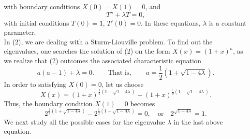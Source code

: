 \documentclass[12pt]{article}
\begin{document}
with boundary conditions $X(0)=X(1)=0$, and
\begin{equation}
T''+\lambda T=0,
\end{equation}
with initial conditions $T(0)=1$, $T'(0)=0$. In these equations, $\lambda$ is a constant parameter. \\
In (2), we are dealing with a Sturm-Liouville problem. To find out the eigenvalues, one searches the solution of (2) on the form $X(x)=(1+x)^a$, as we realize that (2) outcomes the associated characteristic equation
\begin{equation*}
a(a-1)+\lambda=0. \qquad \textrm{That is}, \qquad a=\frac{1}{2}(1\pm\sqrt{1-4\lambda}).
\end{equation*}
In order to satisfying $X(0)=0$, let us choose
\begin{equation*}
X(x)=(1+x)^{\frac{1}{2}(1+\sqrt{1-4\lambda})}-(1+x)^{\frac{1}{2}(1-\sqrt{1-4\lambda})}.
\end{equation*}
Thus, the boundary condition $X(1)=0$ becomes
\begin{equation*}
2^{\frac{1}{2}(1+\sqrt{1-4\lambda})}-2^{\frac{1}{2}(1-\sqrt{1-4\lambda})}=0, 
\quad \textrm{or}\quad 2^{\sqrt{1-4\lambda}}=1.
\end{equation*}
We next study all the possible cases for the eigenvalue $\lambda$ in the last above equation.
\end{document}
